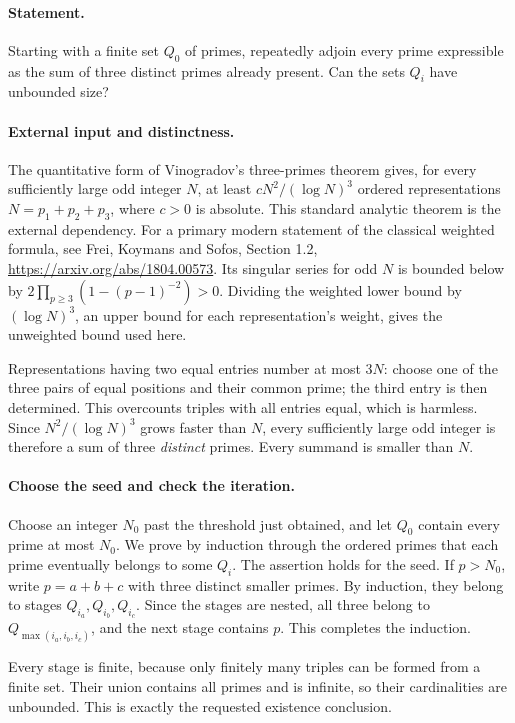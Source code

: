 \paragraph{Statement.}
Starting with a finite set \(Q_0\) of primes, repeatedly adjoin every
prime expressible as the sum of three distinct primes already present.
Can the sets \(Q_i\) have unbounded size?

\paragraph{External input and distinctness.}
The quantitative form of Vinogradov's three-primes theorem gives,
for every sufficiently large odd integer \(N\), at least
\(cN^2/(\log N)^3\) ordered representations \(N=p_1+p_2+p_3\),
where \(c>0\) is absolute. This standard analytic theorem is the
external dependency.
For a primary modern statement of the classical weighted formula, see
Frei, Koymans and Sofos, Section 1.2,
\url{https://arxiv.org/abs/1804.00573}.
Its singular series for odd \(N\) is bounded below by
\(2\prod_{p\geq3}(1-(p-1)^{-2})>0\).
Dividing the weighted lower bound by \((\log N)^3\), an upper bound
for each representation's weight, gives the unweighted bound used here.

Representations having two equal entries number at most \(3N\):
choose one of the three pairs of equal positions and their common
prime; the third entry is then determined. This overcounts triples
with all entries equal, which is harmless.
Since \(N^2/(\log N)^3\) grows faster than \(N\), every sufficiently
large odd integer is therefore a sum of three \emph{distinct} primes.
Every summand is smaller than \(N\).

\paragraph{Choose the seed and check the iteration.}
Choose an integer \(N_0\) past the threshold just obtained, and let
\(Q_0\) contain every prime at most \(N_0\).
We prove by induction through the ordered primes that each prime
eventually belongs to some \(Q_i\).
The assertion holds for the seed. If \(p>N_0\), write \(p=a+b+c\)
with three distinct smaller primes. By induction, they belong to
stages \(Q_{i_a},Q_{i_b},Q_{i_c}\).
Since the stages are nested, all three belong to
\(Q_{\max(i_a,i_b,i_c)}\), and the next stage contains \(p\).
This completes the induction.

Every stage is finite, because only finitely many triples can be
formed from a finite set. Their union contains all primes and is
infinite, so their cardinalities are unbounded. This is exactly the
requested existence conclusion.

